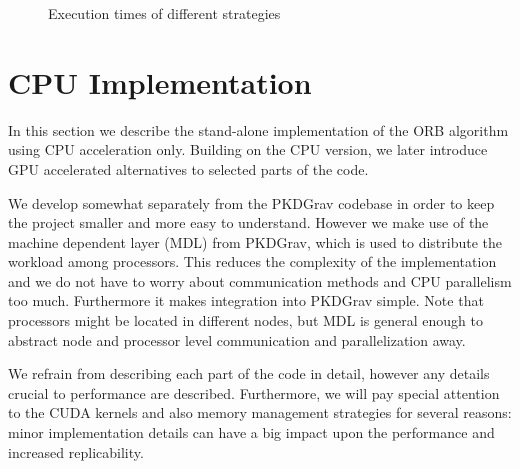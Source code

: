 \documentclass[]{article}
\begin{document}
\begin{figure}[H]
	\begin{center}
	\end{center}

\caption{Execution times of different strategies}
\label{fig:exectimes}
\end{figure}


\newpage
\section{CPU Implementation}

In this section we describe the stand-alone implementation of the ORB algorithm using CPU acceleration only. Building on the CPU version, we later introduce GPU accelerated alternatives to selected parts of the code. 

We develop somewhat separately from the PKDGrav codebase in order to keep the project smaller and more easy to understand. However we make use of the machine dependent layer (MDL) from PKDGrav, which is used to distribute the workload among processors. This reduces the complexity of the implementation and we do not have to worry about communication methods and CPU parallelism too much. Furthermore it makes integration into PKDGrav simple. Note that processors might be located in different nodes, but MDL is general enough to abstract node and processor level communication and parallelization away.

We refrain from describing each part of the code in detail, however any details crucial to performance are described. Furthermore, we will pay special attention to the CUDA kernels and also memory management strategies for several reasons: minor implementation details can have a big impact upon the performance and increased replicability.
\end{document}
